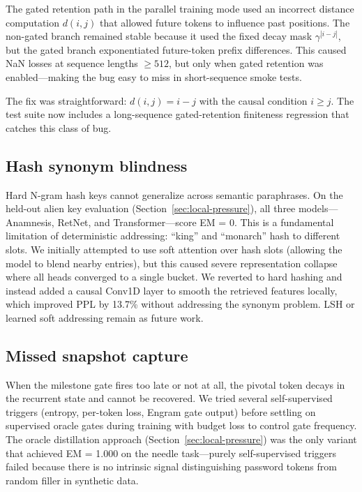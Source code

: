 \documentclass[preprint,12pt]{elsarticle}
\begin{document}
The gated retention path in the parallel training mode used an incorrect distance computation $d(i,j)$ that allowed future tokens to influence past positions. The non-gated branch remained stable because it used the fixed decay mask $\gamma^{|i-j|}$, but the gated branch exponentiated future-token prefix differences. This caused NaN losses at sequence lengths $\geq 512$, but only when gated retention was enabled---making the bug easy to miss in short-sequence smoke tests.

The fix was straightforward: $d(i,j) = i - j$ with the causal condition $i \geq j$. The test suite now includes a long-sequence gated-retention finiteness regression that catches this class of bug.

\subsection{Hash synonym blindness}

Hard N-gram hash keys cannot generalize across semantic paraphrases. On the held-out alien key evaluation (Section~\ref{sec:local-pressure}), all three models---Anamnesis, RetNet, and Transformer---score EM = 0. This is a fundamental limitation of deterministic addressing: ``king'' and ``monarch'' hash to different slots. We initially attempted to use soft attention over hash slots (allowing the model to blend nearby entries), but this caused severe representation collapse where all heads converged to a single bucket. We reverted to hard hashing and instead added a causal Conv1D layer to smooth the retrieved features locally, which improved PPL by 13.7\% without addressing the synonym problem. LSH or learned soft addressing remain as future work.

\subsection{Missed snapshot capture}

When the milestone gate fires too late or not at all, the pivotal token decays in the recurrent state and cannot be recovered. We tried several self-supervised triggers (entropy, per-token loss, Engram gate output) before settling on supervised oracle gates during training with budget loss to control gate frequency. The oracle distillation approach (Section~\ref{sec:local-pressure}) was the only variant that achieved EM = 1.000 on the needle task---purely self-supervised triggers failed because there is no intrinsic signal distinguishing password tokens from random filler in synthetic data.
\end{document}
